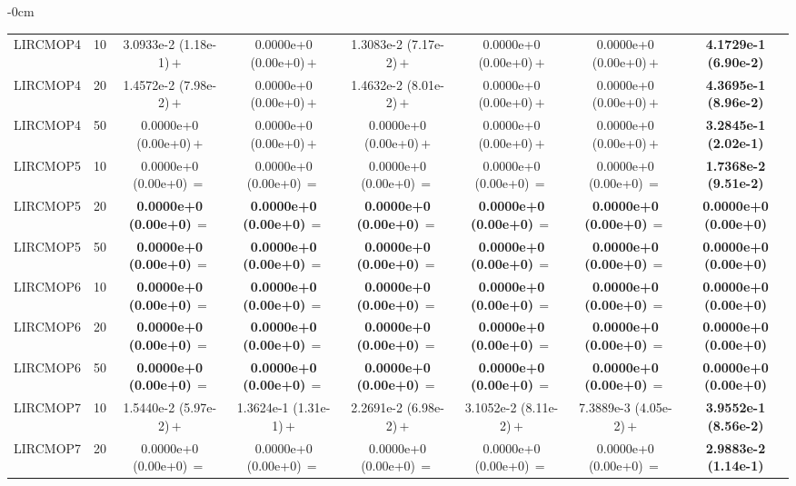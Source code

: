 \begin{table}[!htbp]
\begin{ROneBlock}
\begin{adjustwidth}{-\extralength}{0cm}
\begin{tabular*}{\linewidth}{@{\extracolsep{\fill}}llcccccc@{}}
LIRCMOP4 & 10 & 3.0933e-2 (1.18e-1)\,$+$ & 0.0000e+0 (0.00e+0)\,$+$ & 1.3083e-2 (7.17e-2)\,$+$ & 0.0000e+0 (0.00e+0)\,$+$ & 0.0000e+0 (0.00e+0)\,$+$ & \textbf{4.1729e-1 (6.90e-2)} \\
LIRCMOP4 & 20 & 1.4572e-2 (7.98e-2)\,$+$ & 0.0000e+0 (0.00e+0)\,$+$ & 1.4632e-2 (8.01e-2)\,$+$ & 0.0000e+0 (0.00e+0)\,$+$ & 0.0000e+0 (0.00e+0)\,$+$ & \textbf{4.3695e-1 (8.96e-2)} \\
LIRCMOP4 & 50 & 0.0000e+0 (0.00e+0)\,$+$ & 0.0000e+0 (0.00e+0)\,$+$ & 0.0000e+0 (0.00e+0)\,$+$ & 0.0000e+0 (0.00e+0)\,$+$ & 0.0000e+0 (0.00e+0)\,$+$ & \textbf{3.2845e-1 (2.02e-1)} \\
LIRCMOP5 & 10 & 0.0000e+0 (0.00e+0)\,$=$ & 0.0000e+0 (0.00e+0)\,$=$ & 0.0000e+0 (0.00e+0)\,$=$ & 0.0000e+0 (0.00e+0)\,$=$ & 0.0000e+0 (0.00e+0)\,$=$ & \textbf{1.7368e-2 (9.51e-2)} \\
LIRCMOP5 & 20 & \textbf{0.0000e+0 (0.00e+0)}\,$=$ & \textbf{0.0000e+0 (0.00e+0)}\,$=$ & \textbf{0.0000e+0 (0.00e+0)}\,$=$ & \textbf{0.0000e+0 (0.00e+0)}\,$=$ & \textbf{0.0000e+0 (0.00e+0)}\,$=$ & \textbf{0.0000e+0 (0.00e+0)} \\
LIRCMOP5 & 50 & \textbf{0.0000e+0 (0.00e+0)}\,$=$ & \textbf{0.0000e+0 (0.00e+0)}\,$=$ & \textbf{0.0000e+0 (0.00e+0)}\,$=$ & \textbf{0.0000e+0 (0.00e+0)}\,$=$ & \textbf{0.0000e+0 (0.00e+0)}\,$=$ & \textbf{0.0000e+0 (0.00e+0)} \\
LIRCMOP6 & 10 & \textbf{0.0000e+0 (0.00e+0)}\,$=$ & \textbf{0.0000e+0 (0.00e+0)}\,$=$ & \textbf{0.0000e+0 (0.00e+0)}\,$=$ & \textbf{0.0000e+0 (0.00e+0)}\,$=$ & \textbf{0.0000e+0 (0.00e+0)}\,$=$ & \textbf{0.0000e+0 (0.00e+0)} \\
LIRCMOP6 & 20 & \textbf{0.0000e+0 (0.00e+0)}\,$=$ & \textbf{0.0000e+0 (0.00e+0)}\,$=$ & \textbf{0.0000e+0 (0.00e+0)}\,$=$ & \textbf{0.0000e+0 (0.00e+0)}\,$=$ & \textbf{0.0000e+0 (0.00e+0)}\,$=$ & \textbf{0.0000e+0 (0.00e+0)} \\
LIRCMOP6 & 50 & \textbf{0.0000e+0 (0.00e+0)}\,$=$ & \textbf{0.0000e+0 (0.00e+0)}\,$=$ & \textbf{0.0000e+0 (0.00e+0)}\,$=$ & \textbf{0.0000e+0 (0.00e+0)}\,$=$ & \textbf{0.0000e+0 (0.00e+0)}\,$=$ & \textbf{0.0000e+0 (0.00e+0)} \\
LIRCMOP7 & 10 & 1.5440e-2 (5.97e-2)\,$+$ & 1.3624e-1 (1.31e-1)\,$+$ & 2.2691e-2 (6.98e-2)\,$+$ & 3.1052e-2 (8.11e-2)\,$+$ & 7.3889e-3 (4.05e-2)\,$+$ & \textbf{3.9552e-1 (8.56e-2)} \\
LIRCMOP7 & 20 & 0.0000e+0 (0.00e+0)\,$=$ & 0.0000e+0 (0.00e+0)\,$=$ & 0.0000e+0 (0.00e+0)\,$=$ & 0.0000e+0 (0.00e+0)\,$=$ & 0.0000e+0 (0.00e+0)\,$=$ & \textbf{2.9883e-2 (1.14e-1)} \\

\end{tabular*}
\end{adjustwidth}
\end{ROneBlock}
\end{table}
